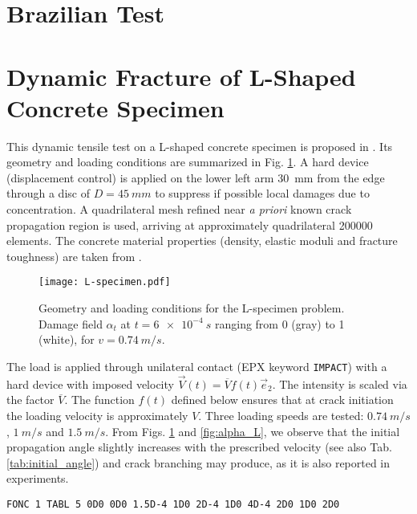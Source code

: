 \section{Brazilian Test} \label{sec:brazilian}

\section{Dynamic Fracture of L-Shaped Concrete Specimen} \label{sec:L-specimen}
This dynamic tensile test on a L-shaped concrete specimen is proposed in \cite{OzboltBedeSharmaMayer:2015}. Its geometry and loading conditions are summarized in Fig. \ref{fig:L-specimen}. A hard device (displacement control) is applied on the lower left arm \SI{30}{mm} from the edge through a disc of $D=\SI{45}{mm}$ to suppress if possible local damages due to concentration. A quadrilateral mesh refined near \emph{a priori} known crack propagation region is used, arriving at approximately quadrilateral \num{200000} elements. The concrete material properties (density, elastic moduli and fracture toughness) are taken from \cite{OzboltBedeSharmaMayer:2015}.
\begin{figure}[htbp]
\centering
\texttt{[image: L-specimen.pdf]}
\caption{Geometry and loading conditions for the L-specimen problem. Damage field $\alpha_t$ at $t=\SI{6e-4}{s}$ ranging from 0 (gray) to 1 (white), for $v=\SI{0.74}{m/s}$.} \label{fig:L-specimen}
\end{figure}

The load is applied through unilateral contact (EPX keyword \texttt{IMPACT}) with a hard device with imposed velocity $\vec{V}(t)=\overline{V}f(t)\vec{e}_2$. The intensity is scaled via the factor $\overline{V}$. The function $f(t)$ defined below ensures that at crack initiation the loading velocity is approximately $V$. Three loading speeds are tested: $\SI{0.74}{m/s}$, $\SI{1}{m/s}$ and $\SI{1.5}{m/s}$. From Figs. \ref{fig:L-specimen} and \ref{fig:alpha_L}, we observe that the initial propagation angle slightly increases with the prescribed velocity (see also Tab. \ref{tab:initial_angle}) and crack branching may produce, as it is also reported in experiments.
\begin{mdframed}[hidealllines=true,backgroundcolor=gray!20]
\begin{verbatim}
FONC 1 TABL 5 0D0 0D0 1.5D-4 1D0 2D-4 1D0 4D-4 2D0 1D0 2D0
\end{verbatim}
\end{mdframed}


